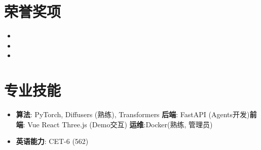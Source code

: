 \documentclass[UTF8,AutoFakeBold]{resume}
\begin{document}
\section{\hspace{0.25em}\makebox[0.75em][c]{\faTrophy} \fangsong\textbf{荣誉奖项}}
    \vspace{0.1em}
    \begin{itemize}
        \item {}
        \item {}
\item {}
    \end{itemize}
\section{\hspace{0.25em}\makebox[0.75em][c]{\faPuzzlePiece} \fangsong\textbf{专业技能}}
\noindent
    \begin{minipage}[t]{0.75\textwidth}
     \raggedright
        \begin{itemize}
            \item \kaishu\textbf{算法}: PyTorch, Diffusers (熟练), Transformers \textbf{后端}: FastAPI (Agents开发)\linebreak\textbf{前端}: Vue React Three.js (Demo交互) \textbf{运维}:Docker(熟练, 管理员) 
        \end{itemize}
    \end{minipage}%
    \begin{minipage}[t]{0.5\textwidth}
        \begin{itemize}
            \item \kaishu\textbf{英语能力}: CET-6 (562)
        \end{itemize}
    \end{minipage}
\end{document}
